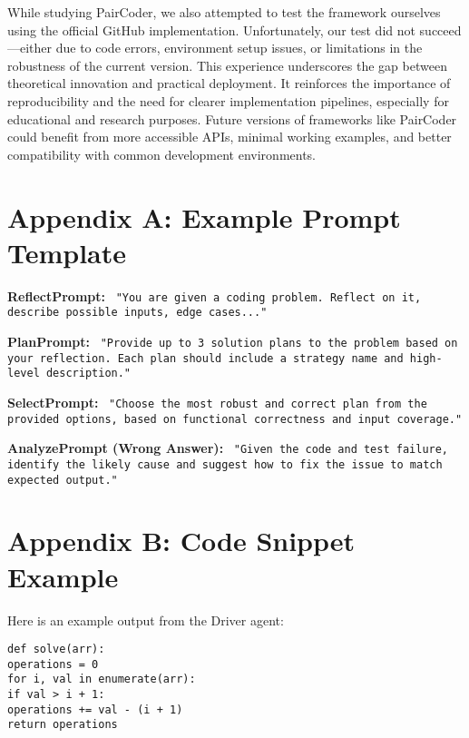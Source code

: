 \documentclass[11pt,a4paper]{article}
\begin{document}
While studying PairCoder, we also attempted to test the framework ourselves using the official GitHub implementation. Unfortunately, our test did not succeed—either due to code errors, environment setup issues, or limitations in the robustness of the current version. This experience underscores the gap between theoretical innovation and practical deployment. It reinforces the importance of reproducibility and the need for clearer implementation pipelines, especially for educational and research purposes. Future versions of frameworks like PairCoder could benefit from more accessible APIs, minimal working examples, and better compatibility with common development environments.




\newpage
\appendix

\section{Appendix A: Example Prompt Template}
\textbf{ReflectPrompt:} \
\texttt{"You are given a coding problem. Reflect on it, describe possible inputs, edge cases..."}

\textbf{PlanPrompt:} \
\texttt{"Provide up to 3 solution plans to the problem based on your reflection. Each plan should include a strategy name and high-level description."}

\textbf{SelectPrompt:} \
\texttt{"Choose the most robust and correct plan from the provided options, based on functional correctness and input coverage."}

\textbf{AnalyzePrompt (Wrong Answer):} \
\texttt{"Given the code and test failure, identify the likely cause and suggest how to fix the issue to match expected output."}

\section{Appendix B: Code Snippet Example}
Here is an example output from the Driver agent:
\begin{verbatim}
def solve(arr):
operations = 0
for i, val in enumerate(arr):
if val > i + 1:
operations += val - (i + 1)
return operations
\end{verbatim}


\end{document}
